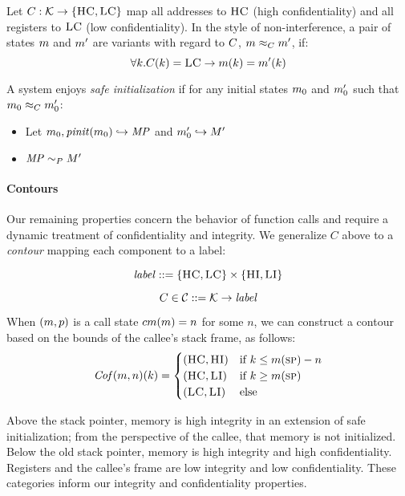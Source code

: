 \documentclass[conference]{IEEEtran}
\begin{document}
      Let \(C : {\mathcal K} \rightarrow \{\textsc{HC},\textsc{LC}\}\) map all addresses
      to \(\textsc{HC}\) (high confidentiality) and all registers to \(\textsc{LC}\)
      (low confidentiality). In the style of non-interference, a pair of states \(m\)
      and \(m'\) are variants with regard to \(C\), \(m \approx_C m'\), if:
      \[\forall k . C(k) = \textsc{LC} \rightarrow m(k) = m'(k)\]
      
      A system enjoys {\it safe initialization} if for any initial states \(m_0\)
      and \(m_0'\) such that \(m_0 \approx_C m_0'\):

      \begin{itemize}
        \item Let \(m_0,\mathit{pinit}(m_0) \hookrightarrow \mathit{MP}\) and \(m_0' \hookrightarrow M'\)
        \item \(\mathit{MP} \sim_P M'\)
      \end{itemize}

    \paragraph{Contours}

      Our remaining properties concern the behavior of function calls and require a dynamic treatment
      of confidentiality and integrity. We generalize \(C\) above to a {\it contour} mapping each component
      to a label:

      \[\mathit{label} ::= \{\textsc{HC},\textsc{LC}\} \times \{\textsc{HI},\textsc{LI}\}\]

      \[C \in {\mathcal C} ::= {\mathcal K} \rightarrow \mathit{label}\]

      When \((m,p)\) is a call state \(cm(m) = n\) for some \(n\),
      we can construct a contour based on the bounds of the callee's stack frame, as follows:
      \[\mathit{Cof}(m,n)(k) =
      \begin{cases}
        (\textsc{HC},\textsc{HI}) & \text{if } k \leq m(\textsc{sp}) - n \\
        (\textsc{HC},\textsc{LI}) & \text{if } k \geq m(\textsc{sp}) \\
        (\textsc{LC},\textsc{LI}) & \text{else} \\
      \end{cases}\]

      Above the stack pointer, memory is high integrity in an extension of safe initialization;
      from the perspective of the callee, that memory is not initialized. Below the old stack
      pointer, memory is high integrity and high confidentiality. Registers and the callee's frame
      are low integrity and low confidentiality. These categories inform our integrity and
      confidentiality properties.
\end{document}
